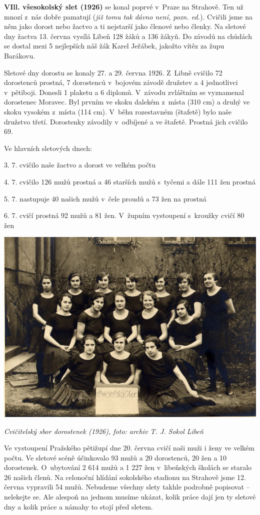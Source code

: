 \documentclass[a5paper, 11pt, twoside]{article}
\begin{document}
\textbf{VIll. všesokolský slet (1926)} se konal poprvé v~Praze na
Strahově. Ten už mnozí z~nás dobře pamatují (\textit{již tomu tak dávno
není, pozn. ed.}). Cvičili jsme na něm jako dorost nebo žactvo a ti
nejstarší jako členové nebo členky. Na sletové dny žactva 13. června
vysílá Libeň 128 žáků a 136 žákyň. Do závodů na chůdách se dostal mezi 5
nejlepších náš žák Karel Jeřábek, jakožto vítěz za župu Barákovu.

Sletové dny dorostu se konaly 27. a 29. června 1926. Z~Libně cvičilo 72
dorostenců prostná, 7 dorostenců v~bojovém závodě družstev a 4
jednotlivci v~pětiboji. Donesli 1 plaketu a 6 diplomů. V~závodu
zvláštním se vyznamenal dorostenec Moravec. Byl prvním ve skoku dalekém
z~místa (310 cm) a druhý ve skoku vysokém z~místa (114 cm). V~běhu
rozestavném (štafetě) bylo naše družstvo třetí. Dorostenky závodily
v~odbíjené a ve štafetě. Prostná jich cvičilo 69.

Ve hlavních sletových dnech:

3. 7. cvičilo naše žactvo a dorost ve velkém počtu

4. 7. cvičilo 126 mužů prostná a 46 starších mužů s~tyčemi a dále 111
žen prostná

5. 7. nastupuje 40 našich mužů v~čele proudů a 73 žen na prostná

6. 7. cvičí prostná 92 mužů a 81 žen. V~župním vystoupení s~kroužky
cvičí 80 žen

 \includegraphics[width=\textwidth]{img/27_dorostenky.jpg}

\textit{Cvičitelský sbor dorostenek (1926), foto: archiv T. J. Sokol
Libeň}

Ve vystoupení Pražského pětižupí dne 20. června cvičí naši muži i ženy
ve velkém počtu. Ve sletové scéně účinkovalo 93 mužů a 20 dorostenců, 20
žen a 10 dorostenek. O~ubytování 2 614 mužů a 1 227 žen v~libeňských
školách se staralo 26 našich členů. Na celonoční hlídání sokolského
stadionu na Strahově jsme 12. června vypravili 54 mužů. Nebudeme všechny
slety takhle podrobně popisovat -- nelekejte se. Ale alespoň na jednom
musíme ukázat, kolik práce dají jen ty sletové dny a kolik práce a
námahy to stojí před sletem.
\end{document}
